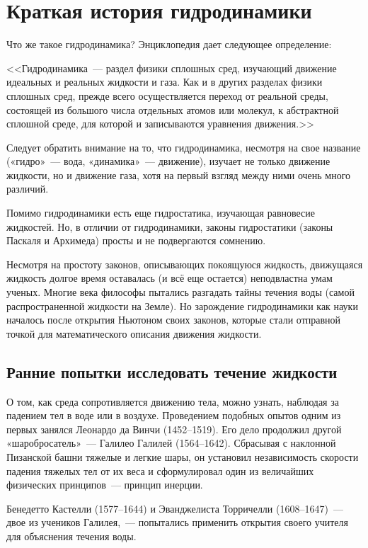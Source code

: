 \section{Краткая история гидродинамики}

Что же такое гидродинамика? Энциклопедия дает следующее определение:

<<Гидродинамика~--- раздел физики сплошных сред, изучающий движение идеальных и реальных жидкости и газа. Как и в других разделах физики сплошных сред, прежде всего осуществляется переход от реальной среды, состоящей из большого числа отдельных атомов или молекул, к абстрактной сплошной среде, для которой и записываются уравнения движения.>>

Следует обратить внимание на то, что гидродинамика, несмотря на свое название («гидро»~--- вода, «динамика»~--- движение), изучает не только движение жидкости, но и движение газа, хотя на первый взгляд между ними очень много различий.

Помимо гидродинамики есть еще гидростатика, изучающая равновесие жидкостей. Но, в отличии от гидродинамики, законы гидростатики (законы Паскаля и Архимеда) просты и не подвергаются сомнению.

Несмотря на простоту законов, описывающих покоящуюся жидкость, движущаяся жидкость долгое время оставалась (и всё еще остается) неподвластна умам ученых. Многие века философы пытались разгадать тайны течения воды (самой распространенной жидкости на Земле). Но зарождение гидродинамики как науки началось после открытия Ньютоном своих законов, которые стали отправной точкой для математического описания движения жидкости.

\subsection*{Ранние попытки исследовать течение жидкости}

О том, как среда сопротивляется движению тела, можно узнать, наблюдая за падением тел в воде или в воздухе. 
Проведением подобных опытов одним из первых занялся Леонардо да Винчи (1452--1519). 
Его дело продолжил другой «шаробросатель»~--- Галилео Галилей (1564--1642). 
Сбрасывая с наклонной Пизанской башни тяжелые и легкие шары, он установил независимость 
скорости падения тяжелых тел от их веса и сформулировал один из величайших физических принципов~--- принцип инерции.

Бенедетто Кастелли (1577--1644) и Эванджелиста Торричелли (1608--1647)~--- двое из учеников 
Галилея,~--- попытались применить открытия своего учителя для объяснения течения воды.


